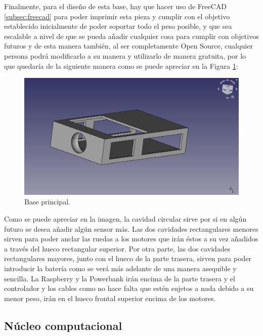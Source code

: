 Finalmente, para el diseño de esta base, hay que hacer uso de FreeCAD \ref{subsec:freecad} para poder imprimir esta pieza y cumplir con el objetivo establecido inicialmente de poder soportar todo el peso posible, y que sea escalable a nivel de que se pueda añadir cualquier cosa para cumplir con objetivos futuros y de esta manera también, al ser completamente Open Source, cualquier persona podrá modificarlo a su manera y utilizarlo de manera gratuita, por lo que quedaría de la siguiente manera como se puede apreciar en la Figura \ref{fig:Base_principal}:

\begin{figure}[H]
  \centering
  \includegraphics[scale=0.25]{figs/base} %
  \caption{Base principal.}
  \label{fig:Base_principal}
\end{figure}

Como se puede apreciar en la imagen, la cavidad circular sirve por si en algún futuro se desea añadir algún sensor más. Las dos cavidades rectangulares menores sirven para poder anclar las ruedas a los motores que irán éstos a su vez añadidos a través del hueco rectangular superior. Por otra parte, las dos cavidades rectangulares mayores, junto con el hueco de la parte trasera, sirven para poder introducir la batería como se verá más adelante de una manera asequible y sencilla. La Raspberry y la Powerbank irán encima de la parte trasera y el controlador y los cables como no hace falta que estén sujetos a nada debido a su menor peso, irán en el hueco frontal superior encima de los motores.


\subsection{Núcleo computacional}
\label{subsec:plataforma_hardware}


